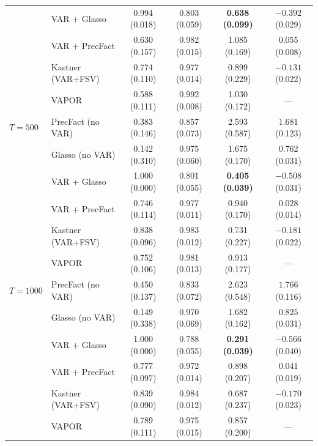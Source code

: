 \begin{table}[h!]
\begin{tabular}{llcccc}
           & VAR + Glasso       & 0.994 (0.018) & 0.803 (0.059) & \textbf{0.638 (0.099)} & $-0.392$ (0.029) \\
           & VAR + PrecFact     & 0.630 (0.157) & 0.982 (0.015) & 1.085 (0.169) & $0.055$ (0.008) \\
           & Kastner (VAR+FSV)  & 0.774 (0.110) & 0.977 (0.014) & 0.899 (0.229) & $-0.131$ (0.022) \\
           & VAPOR              & 0.588 (0.111) & 0.992 (0.008) & 1.030 (0.172) & --- \\
\midrule
$T = 500$  & PrecFact (no VAR)  & 0.383 (0.146) & 0.857 (0.073) & 2.593 (0.587) & $1.681$ (0.123) \\
           & Glasso (no VAR)    & 0.142 (0.310) & 0.975 (0.060) & 1.675 (0.170) & $0.762$ (0.031) \\
           & VAR + Glasso       & 1.000 (0.000) & 0.801 (0.055) & \textbf{0.405 (0.039)} & $-0.508$ (0.031) \\
           & VAR + PrecFact     & 0.746 (0.114) & 0.977 (0.011) & 0.940 (0.170) & $0.028$ (0.014) \\
           & Kastner (VAR+FSV)  & 0.838 (0.096) & 0.983 (0.012) & 0.731 (0.227) & $-0.181$ (0.022) \\
           & VAPOR              & 0.752 (0.106) & 0.981 (0.013) & 0.913 (0.177) & --- \\
\midrule
$T = 1000$ & PrecFact (no VAR)  & 0.450 (0.137) & 0.833 (0.072) & 2.623 (0.548) & $1.766$ (0.116) \\
           & Glasso (no VAR)    & 0.149 (0.338) & 0.970 (0.069) & 1.682 (0.162) & $0.825$ (0.031) \\
           & VAR + Glasso       & 1.000 (0.000) & 0.788 (0.055) & \textbf{0.291 (0.039)} & $-0.566$ (0.040) \\
           & VAR + PrecFact     & 0.777 (0.097) & 0.972 (0.014) & 0.898 (0.207) & $0.041$ (0.019) \\
           & Kastner (VAR+FSV)  & 0.839 (0.090) & 0.984 (0.012) & 0.687 (0.237) & $-0.170$ (0.023) \\
           & VAPOR              & 0.789 (0.111) & 0.975 (0.015) & 0.857 (0.200) & --- \\
\bottomrule
\end{tabular}
\end{table}

